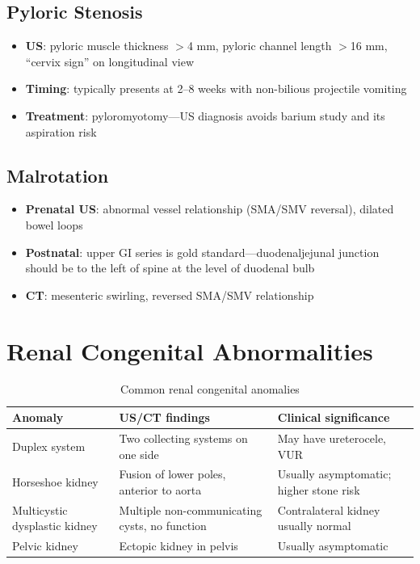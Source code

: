 \subsection{Pyloric Stenosis}
\begin{itemize}
  \item \textbf{US}: pyloric muscle thickness $>$4 mm, pyloric channel length $>$16 mm, ``cervix sign'' on longitudinal view
  \item \textbf{Timing}: typically presents at 2--8 weeks with non-bilious projectile vomiting
  \item \textbf{Treatment}: pyloromyotomy---US diagnosis avoids barium study and its aspiration risk
\end{itemize}

\subsection{Malrotation}
\begin{itemize}
  \item \textbf{Prenatal US}: abnormal vessel relationship (SMA/SMV reversal), dilated bowel loops
  \item \textbf{Postnatal}: upper GI series is gold standard---duodenaljejunal junction should be to the left of spine at the level of duodenal bulb
  \item \textbf{CT}: mesenteric swirling, reversed SMA/SMV relationship
\end{itemize}

\section{Renal Congenital Abnormalities}

\begin{table}[h]
\centering
\caption{Common renal congenital anomalies}
\begin{tabular}{|p{}|p{}|p{}|}
\hline
\textbf{Anomaly} & \textbf{US/CT findings} & \textbf{Clinical significance} \\
\hline
Duplex system & Two collecting systems on one side & May have ureterocele, VUR \\
Horseshoe kidney & Fusion of lower poles, anterior to aorta & Usually asymptomatic; higher stone risk \\
Multicystic dysplastic kidney & Multiple non-communicating cysts, no function & Contralateral kidney usually normal \\
Pelvic kidney & Ectopic kidney in pelvis & Usually asymptomatic \\
\hline
\end{tabular}
\end{table}

